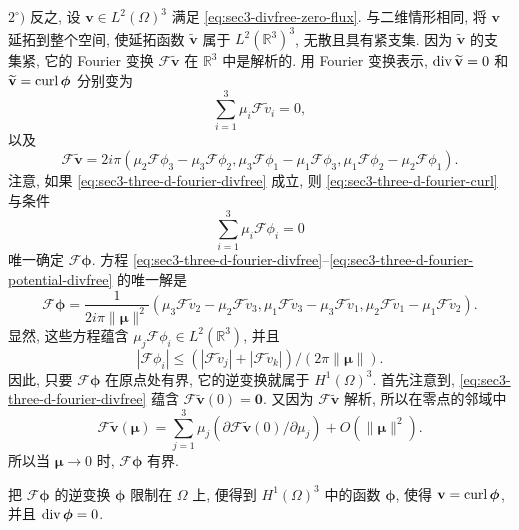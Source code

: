 \begin{Proof}
$2^\circ)$ 反之, 设 $\mathbf v\in L^2(\Omega)^3$ 满足
\eqref{eq:sec3-divfree-zero-flux}. 与二维情形相同, 将 $\mathbf v$ 延拓到整个空间,
使延拓函数 $\widetilde{\mathbf v}$ 属于 $L^2(\mathbb R^3)^3$, 无散且具有紧支集.
因为 $\widetilde{\mathbf v}$ 的支集紧, 它的 Fourier 变换
$\mathscr F\widetilde{\mathbf v}$ 在 $\mathbb R^3$ 中是解析的. 用 Fourier 变换表示,
$\operatorname{div}\widetilde{\mathbf v}=0$ 和
$\widetilde{\mathbf v}=\operatorname{curl}\boldsymbol\phi$ 分别变为
\begin{equation}\label{eq:sec3-three-d-fourier-divfree}
\sum_{i=1}^3\mu_i\mathscr F\widetilde v_i=0,
\end{equation}
以及
\begin{equation}\label{eq:sec3-three-d-fourier-curl}
\mathscr F\widetilde{\mathbf v}=2i\pi(
\mu_2\mathscr F\phi_3-\mu_3\mathscr F\phi_2,
\mu_3\mathscr F\phi_1-\mu_1\mathscr F\phi_3,
\mu_1\mathscr F\phi_2-\mu_2\mathscr F\phi_1).
\end{equation}
注意, 如果 \eqref{eq:sec3-three-d-fourier-divfree} 成立, 则
\eqref{eq:sec3-three-d-fourier-curl} 与条件
\begin{equation}\label{eq:sec3-three-d-fourier-potential-divfree}
\sum_{i=1}^3\mu_i\mathscr F\phi_i=0
\end{equation}
唯一确定 $\mathscr F\boldsymbol\phi$. 方程
\eqref{eq:sec3-three-d-fourier-divfree}--\eqref{eq:sec3-three-d-fourier-potential-divfree}
的唯一解是
\[
\mathscr F\boldsymbol\phi=\frac{1}{2i\pi\|\boldsymbol\mu\|^2}(
\mu_3\mathscr F\widetilde v_2-\mu_2\mathscr F\widetilde v_3,
\mu_1\mathscr F\widetilde v_3-\mu_3\mathscr F\widetilde v_1,
\mu_2\mathscr F\widetilde v_1-\mu_1\mathscr F\widetilde v_2).
\]
显然, 这些方程蕴含 $\mu_j\mathscr F\phi_i\in L^2(\mathbb R^3)$, 并且
\[
|\mathscr F\phi_i|\le
(|\mathscr F\widetilde v_j|+|\mathscr F\widetilde v_k|)/(2\pi\|\boldsymbol\mu\|).
\]
因此, 只要 $\mathscr F\boldsymbol\phi$ 在原点处有界, 它的逆变换就属于
$H^1(\Omega)^3$. 首先注意到, \eqref{eq:sec3-three-d-fourier-divfree} 蕴含
$\mathscr F\widetilde{\mathbf v}(0)=\mathbf0$. 又因为
$\mathscr F\widetilde{\mathbf v}$ 解析, 所以在零点的邻域中
\[
\mathscr F\widetilde{\mathbf v}(\boldsymbol\mu)
=\sum_{j=1}^3\mu_j
(\partial\mathscr F\widetilde{\mathbf v}(0)/\partial\mu_j)
+O(\|\boldsymbol\mu\|^2).
\]
所以当 $\boldsymbol\mu\to0$ 时, $\mathscr F\boldsymbol\phi$ 有界.

把 $\mathscr F\boldsymbol\phi$ 的逆变换 $\boldsymbol\phi$ 限制在 $\Omega$ 上,
便得到 $H^1(\Omega)^3$ 中的函数 $\boldsymbol\phi$, 使得
$\mathbf v=\operatorname{curl}\boldsymbol\phi$, 并且 $\operatorname{div}\boldsymbol\phi=0$.
\end{Proof}

